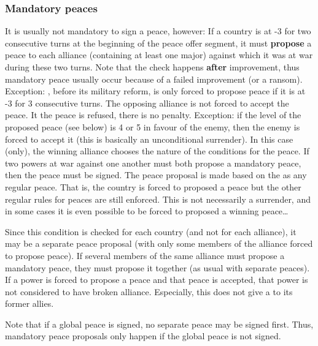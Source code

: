 \subsubsection{Mandatory peaces}\label{chPeace:Mandatory peaces}
 It is usually not mandatory to sign a
peace, however:
\bparag If a country is at -3 \STAB for two consecutive turns at the beginning
of the peace offer segment, it must \textbf{propose} a peace to each alliance
(containing at least one major) against which it was at war during these two
turns. Note that the check happens \textbf{after} \STAB improvement, thus
mandatory peace usually occur because of a failed improvement (or a ransom).
\bparag Exception: \RUS, before its military reform, is only forced to propose
peace if it is at -3 \STAB for 3 consecutive turns.
\bparag The opposing alliance is not forced to accept the peace. It the peace
is refused, there is no penalty.
\bparag Exception: if the level of the proposed peace (see below) is 4 or 5 in
favour of the enemy, then the enemy is forced to accept it (this is basically
an unconditional surrender). In this case (only), the winning alliance chooses
the nature of the conditions for the peace.
\bparag If two powers at war against one another must both propose a mandatory
peace, then the peace must be signed.
\bparag The peace proposal is made based on the  as
any regular peace. That is, the country is forced to proposed a peace but the
other regular rules for peaces are still enforced. This is not necessarily a
surrender, and in some cases it is even possible to be forced to proposed a
winning peace\ldots

\bparag Since this condition is checked for each country (and not for each
alliance), it may be a separate peace proposal (with only some members of the
alliance forced to propose peace).
\bparag If several members of the same alliance must propose a mandatory
peace, they must propose it together (as usual with separate peaces).
\bparag If a power is forced to propose a peace and that peace is accepted,
that power is not considered to have broken alliance.
\bparag Especially, this does not give a \CB to its former allies.

 Note that if a global peace is
signed, no separate peace may be signed first. Thus, mandatory peace proposals
only happen if the global peace is not signed.


